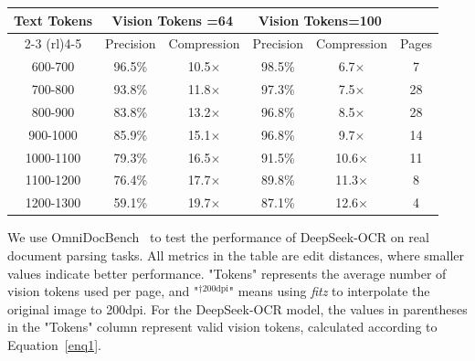 \documentclass[11pt, a4paper, logo, copyright, nonumbering]{deepseek}
\begin{document}
\begin{CJK*}{UTF8}{gbsn}
\begin{table}[!h]
{		\begin{tabular}{ccc|ccc}
			\toprule 
            \multirow{3}{*}{\textbf{Text Tokens}} & \multicolumn{2}{c}{\textbf{Vision Tokens =64}} &\multicolumn{2}{c}{\textbf{Vision Tokens=100}} \\
            \cmidrule(rl){2-3}  \cmidrule(rl){4-5}
             & Precision & Compression & Precision & Compression & Pages \\ 
			\midrule  
			600-700& 96.5\% & 10.5$\times$  & 98.5\% & 6.7$\times$ & 7 \\
			700-800& 93.8\%  & 11.8$\times$ & 97.3\% & 7.5$\times$ & 28\\
			  800-900& 83.8\% & 13.2$\times$ & 96.8\% & 8.5$\times$ & 28 \\
            900-1000& 85.9\% & 15.1$\times$ & 96.8\% & 9.7$\times$ & 14 \\
            1000-1100& 79.3\% & 16.5$\times$ & 91.5\% & 10.6$\times$ & 11 \\
            1100-1200& 76.4\% & 17.7$\times$ & 89.8\% & 11.3$\times$ & 8 \\
            1200-1300& 59.1\% & 19.7$\times$ & 87.1\% & 12.6$\times$ & 4 \\

			\bottomrule		
	\end{tabular}}		

	\label{table2}
\end{table}


\begin{table}[!t]
    \small
	\centering	
        
 	\caption{We use OmniDocBench~\cite{ouyang2025omnidocbench} to test the performance of DeepSeek-OCR on real document parsing tasks. All metrics in the table are edit distances, where smaller values indicate better performance. "Tokens" represents the average number of vision tokens used per page, and "$^{\dagger{\mathrm{200dpi}}}$" means using \textit{fitz} to interpolate the original image to 200dpi. For the DeepSeek-OCR model, the values in parentheses in the "Tokens" column represent valid vision tokens, calculated according to Equation~\ref{enq1}.}
    \setlength{\abovecaptionskip}{0.2cm}
	\setlength{\tabcolsep}{0.5mm}{	
		
}
\end{table}
\end{CJK*}
\end{document}
